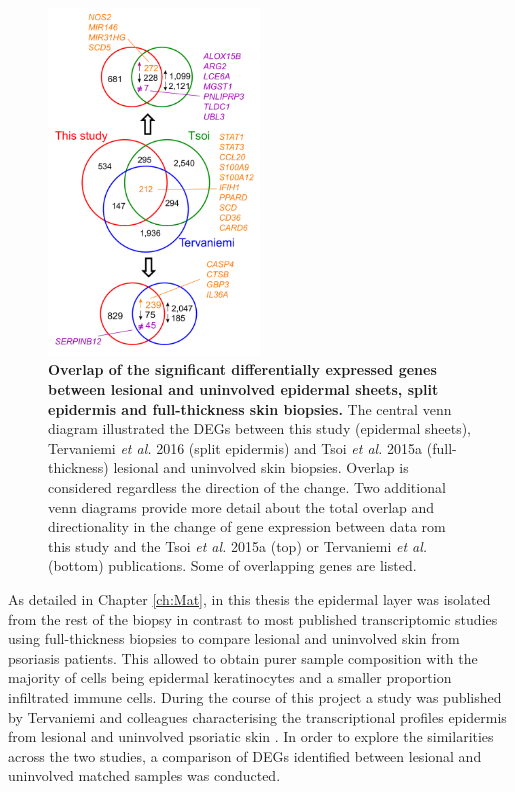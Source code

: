 \begin{figure}[htbp]
	\centering
	\includegraphics[width=0.5\textwidth]{./Results2/pdfs/skin_transcriptomics_venn_diagrams_with_genes}
	\caption[Overlap of the significant differentially expressed genes between lesional and uninvolved epidermal sheets, split epidermis and full-thickness skin biopsies.]{\textbf{Overlap of the significant differentially expressed genes between lesional and uninvolved epidermal sheets, split epidermis and full-thickness skin biopsies.} The central venn diagram illustrated the DEGs between this study (epidermal sheets), Tervaniemi \textit{et al.} 2016 (split epidermis) and Tsoi \textit{et al.} 2015a (full-thickness) lesional and uninvolved skin biopsies. Overlap is considered regardless the direction of the change. Two additional venn diagrams provide more detail about the total overlap and directionality in the change of gene expression between data rom this study and the Tsoi \textit{et al.} 2015a (top) or Tervaniemi \textit{et al.} (bottom) publications. Some of overlapping genes are listed.}
	\label{figure:Skin_venn_diagrams_comparison_other_studies}
\end{figure}

As detailed in Chapter \ref{ch:Mat}, in this thesis the epidermal layer was isolated from the rest of the biopsy in contrast to most published transcriptomic studies using full-thickness biopsies to compare lesional and uninvolved skin from psoriasis patients. This allowed to obtain purer sample composition with the majority of cells being epidermal keratinocytes and a smaller proportion infiltrated immune cells. During the course of this project a study was published by Tervaniemi and colleagues characterising the transcriptional profiles epidermis from lesional and uninvolved psoriatic skin \parencite{Tervaniemi2016}. %
In order to explore the similarities across the two studies, a comparison of DEGs identified between lesional and uninvolved matched samples was conducted. 


